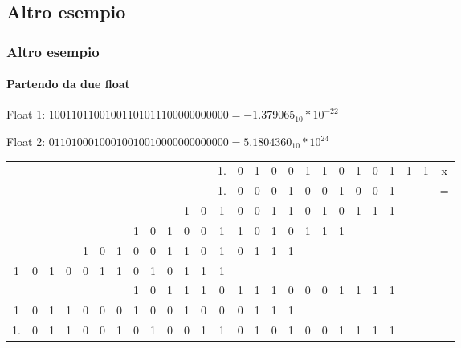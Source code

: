 \documentclass{beamer}
\begin{document}
  \subsection{Altro esempio}
  \begin{frame}
  		\frametitle{Altro esempio}
  		\framesubtitle{Partendo da due float}
  		Float 1: $10011011001001101011100000000000 = -1.379065_{10}*10^{-22}$
  		
  		Float 2: $01101000100010010010000000000000 = 5.1804360_{10}*10^{24}$
  		\vspace{2em}
  		\pause
  		\setlength{\tabcolsep}{2pt}
		\begin{center}
				\begin{tabular}{ccccccccccccccccccccccccc|c}
				  &   &   &   &   &   &   &   &   &   &   &   & 1.& 0 & 1 & 0 & 0 & 1 & 1 & 0 & 1 & 0 & 1 & 1 & 1 & x \\ 
				  &   &   &   &   &   &   &   &   &   &   &   & 1.& 0 & 0 & 0 & 1 & 0 & 0 & 1 & 0 & 0 & 1 &   &   & = \\ 
				\hline 
		      &   &   &   &   &   &   &   &   &   & 1 & 0 & 1 & 0 & 0 & 1 & 1 & 0 & 1 & 0 & 1 & 1 & 1 &   &   &   \\ 
          &   &   &   &   &   &   & 1 & 0 & 1 & 0 & 0 & 1 & 1 & 0 & 1 & 0 & 1 & 1 & 1 &   &   &   &   &   &   \\
  	        &   &   &   & 1 & 0 & 1 & 0 & 0 & 1 & 1 & 0 & 1 & 0 & 1 & 1 & 1 &   &   &   &   &   &   &   &   &   \\
  	      1 & 0 & 1 & 0 & 0 & 1 & 1 & 0 & 1 & 0 & 1 & 1 & 1 &   &   &   &   &   &   &   &   &   &   &   &   &   \\   
				\hline 
				  &   &   &   &   &   &   & 1 & 0 & 1 & 1 & 1 & 0 & 1 & 1 & 1 & 0 & 0 & 0 & 1 & 1 & 1 & 1 &   &   &   \\ 
				1 & 0 & 1 & 1 & 0 & 0 & 0 & 1 & 0 & 0 & 1 & 0 & 0 & 0 & 1 & 1 & 1 &   &   &   &   &   &   &   &   &   \\ 
				\hline 
				1.& 0 & 1 & 1 & 0 & 0 & 1 & 0 & 1 & 0 & 0 & 1 & 1 & 0 & 1 & 0 & 1 & 0 & 0 & 1 & 1 & 1 & 1 &  &    &   \\ 
				\end{tabular} 
		\end{center}
  \end{frame}
\end{document}
